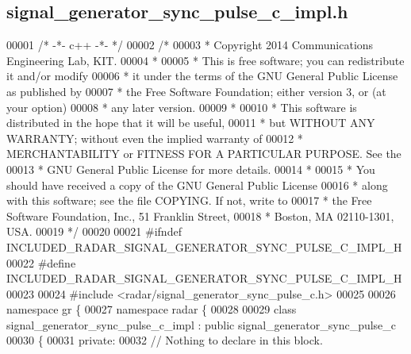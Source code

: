 \subsection{signal\+\_\+generator\+\_\+sync\+\_\+pulse\+\_\+c\+\_\+impl.\+h}
\label{signal__generator__sync__pulse__c__impl_8h_source}

\begin{DoxyCode}
00001 \textcolor{comment}{/* -*- c++ -*- */}
00002 \textcolor{comment}{/* }
00003 \textcolor{comment}{ * Copyright 2014 Communications Engineering Lab, KIT.}
00004 \textcolor{comment}{ * }
00005 \textcolor{comment}{ * This is free software; you can redistribute it and/or modify}
00006 \textcolor{comment}{ * it under the terms of the GNU General Public License as published by}
00007 \textcolor{comment}{ * the Free Software Foundation; either version 3, or (at your option)}
00008 \textcolor{comment}{ * any later version.}
00009 \textcolor{comment}{ * }
00010 \textcolor{comment}{ * This software is distributed in the hope that it will be useful,}
00011 \textcolor{comment}{ * but WITHOUT ANY WARRANTY; without even the implied warranty of}
00012 \textcolor{comment}{ * MERCHANTABILITY or FITNESS FOR A PARTICULAR PURPOSE.  See the}
00013 \textcolor{comment}{ * GNU General Public License for more details.}
00014 \textcolor{comment}{ * }
00015 \textcolor{comment}{ * You should have received a copy of the GNU General Public License}
00016 \textcolor{comment}{ * along with this software; see the file COPYING.  If not, write to}
00017 \textcolor{comment}{ * the Free Software Foundation, Inc., 51 Franklin Street,}
00018 \textcolor{comment}{ * Boston, MA 02110-1301, USA.}
00019 \textcolor{comment}{ */}
00020 
00021 \textcolor{preprocessor}{#ifndef INCLUDED\_RADAR\_SIGNAL\_GENERATOR\_SYNC\_PULSE\_C\_IMPL\_H}
00022 \textcolor{preprocessor}{#define INCLUDED\_RADAR\_SIGNAL\_GENERATOR\_SYNC\_PULSE\_C\_IMPL\_H}
00023 
00024 \textcolor{preprocessor}{#include <radar/signal_generator_sync_pulse_c.h>}
00025 
00026 \textcolor{keyword}{namespace }gr \{
00027   \textcolor{keyword}{namespace }radar \{
00028 
00029     \textcolor{keyword}{class }signal_generator_sync_pulse_c_impl : \textcolor{keyword}{public} 
      signal_generator_sync_pulse_c
00030     \{
00031      \textcolor{keyword}{private}:
00032       \textcolor{comment}{// Nothing to declare in this block.}

\end{DoxyCode}
